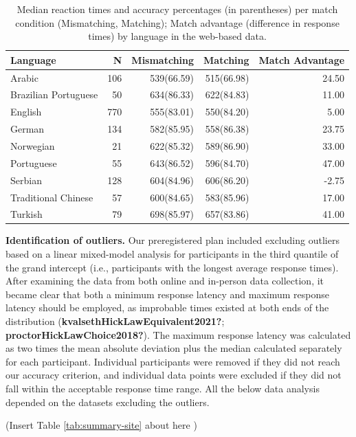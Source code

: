 \documentclass[
  man,floatsintext]{apa6}
\begin{document}
\begin{table}

\caption{\label{tab:summary-osweb}Median reaction times and accuracy percentages (in parentheses) per match condition (Mismatching, Matching); Match advantage (difference in response times) by language in the web-based data.}
\centering
\begin{tabular}[t]{lrrrr}
\toprule
Language & N & Mismatching & Matching & Match Advantage\\
\midrule
Arabic & 106 & 539(66.59) & 515(66.98) & 24.50\\
Brazilian Portuguese & 50 & 634(86.33) & 622(84.83) & 11.00\\
English & 770 & 555(83.01) & 550(84.20) & 5.00\\
German & 134 & 582(85.95) & 558(86.38) & 23.75\\
Norwegian & 21 & 622(85.32) & 589(86.90) & 33.00\\
\addlinespace
Portuguese & 55 & 643(86.52) & 596(84.70) & 47.00\\
Serbian & 128 & 604(84.96) & 606(86.20) & -2.75\\
Traditional Chinese & 57 & 600(84.65) & 583(85.96) & 17.00\\
Turkish & 79 & 698(85.97) & 657(83.86) & 41.00\\
\bottomrule
\end{tabular}
\end{table}

\textbf{Identification of outliers.} Our preregistered plan included excluding outliers based on a linear mixed-model analysis for participants in the third quantile of the grand intercept (i.e., participants with the longest average response times). After examining the data from both online and in-person data collection, it became clear that both a minimum response latency and maximum response latency should be employed, as improbable times existed at both ends of the distribution (\textbf{kvalsethHickLawEquivalent2021?}; \textbf{proctorHickLawChoice2018?}). The maximum response latency was calculated as two times the mean absolute deviation plus the median calculated separately for each participant. Individual participants were removed if they did not reach our accuracy criterion, and individual data points were excluded if they did not fall within the acceptable response time range. All the below data analysis depended on the datasets excluding the outliers.

(Insert Table \ref{tab:summary-site} about here )
\end{document}
